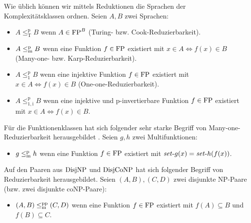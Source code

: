 Wie üblich können wir mittels Reduktionen die Sprachen der Komplexitätsklassen ordnen. Seien $A,B$ zwei Sprachen:
\begin{itemize}
    \item $A\leq_\mathrm{T}^\mathrm{p} B$ wenn $A\in\mathrm{FP}^B$ (Turing- bzw. Cook-Reduzierbarkeit).
    \item $A\leq_\mathrm{m}^\mathrm{p} B$ wenn eine Funktion $f\in\mathrm{FP}$ existiert mit $x\in A\iff f(x)\in B$ (Many-one- bzw. Karp-Reduzierbarkeit).
    \item $A\leq_1^\mathrm{p} B$ wenn eine injektive Funktion $f\in\mathrm{FP}$ existiert mit $x\in A\iff f(x)\in B$ (One-one-Reduzierbarkeit).
    \item $A\leq_\mathrm{1,i}^\mathrm{p} B$ wenn eine injektive und p-invertierbare Funktion $f\in\mathrm{FP}$ existiert mit $x\in A\iff f(x)\in B$.
\end{itemize}
Für die Funktionenklassen hat sich folgender sehr starke Begriff von Many-one-Reduzierbarkeit herausgebildet \parencites{kobler_is_2000}{beyersdorff_nondeterministic_2009}{pudlak_incompleteness_2017}. Seien $g,h$ zwei Multifunktionen:
\begin{itemize}
    \item $g\leq_\mathrm{m}^\mathrm{p} h$ wenn eine Funktion $f\in\mathrm{FP}$ existiert mit $\mathit{set}\text{-}{}g(x)=\mathit{set}\text{-}{}h(f(x))$.
\end{itemize}
Auf den Paaren aus $\mathrm{DisjNP}$ und $\mathrm{DisjCoNP}$ hat sich folgender Begriff von Reduzierbarkeit herausgebildet.
Seien $(A,B), (C,D)$ zwei disjunkte NP-Paare (bzw. zwei disjunkte coNP-Paare):
\begin{itemize}
    \item $(A,B)\leq_\mathrm{m}^\mathrm{pp}(C,D)$ wenn eine Funktion $f\in\mathrm{FP}$ existiert mit $f(A)\subseteq B$ und $f(B)\subseteq C$.
\end{itemize}

